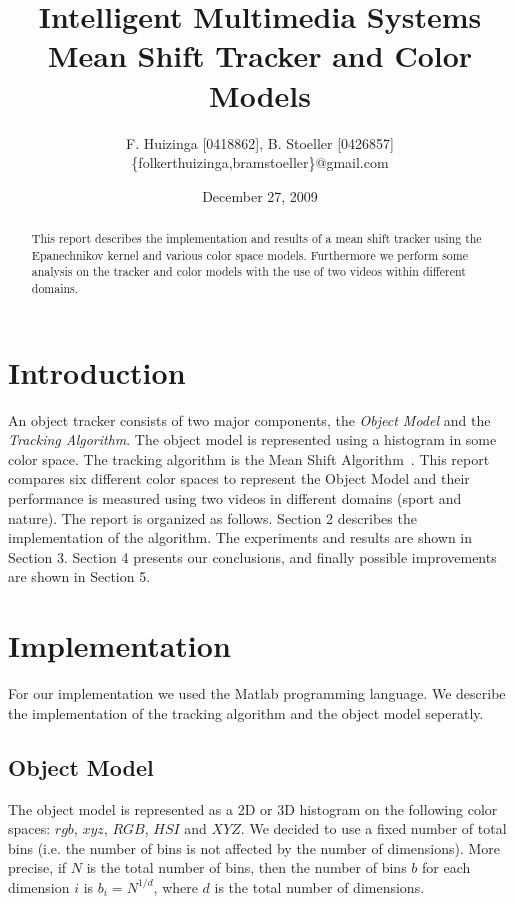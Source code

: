 \documentclass[11pt]{article}
\title{Intelligent Multimedia Systems \\ Mean Shift Tracker and Color Models}
\author{F. Huizinga [0418862], B. Stoeller [0426857] \\
      \{folkerthuizinga,bramstoeller\}@gmail.com}
\date{December 27, 2009}
\begin{document}
\maketitle

\begin{abstract}
This report describes the implementation and results of a mean shift tracker
using the Epanechnikov kernel and various color space models. Furthermore we
perform some analysis on the tracker and color models with the use of two
videos within different domains.
\end{abstract}


\section{Introduction}
An object tracker consists of two major components, the \emph{Object Model} and
the \emph{Tracking Algorithm}. The object model is represented using a
histogram in some color space. The tracking algorithm is the Mean Shift
Algorithm~\cite{kernel-basedobject, real-timetracking}. This report compares
six different color spaces to represent the Object Model and their performance
is measured using two videos in different domains (sport and nature). The
report is organized as follows.  Section 2 describes the implementation of the
algorithm. The experiments and results are shown in Section 3. Section 4
presents our conclusions, and finally possible improvements are shown in
Section 5. \newpage


\section{Implementation}
For our implementation we used the Matlab programming language. We describe the
implementation of the tracking algorithm and the object model seperatly.

\subsection{Object Model}
The object model is represented as a 2D or 3D histogram on the following color
spaces: $rgb$, $xyz$, $RGB$, $HSI$ and $XYZ$. We decided to use a fixed number
of total bins (i.e. the number of bins is not affected by the number of
dimensions).  More precise, if $N$ is the total number of bins, then the number
of bins $b$ for each dimension $i$ is $b_i = N^{1/d}$, where $d$ is the total
number of dimensions. 
\end{document}
